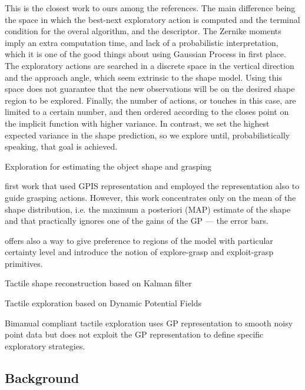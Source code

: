 This is the closest work to ours among the references. The main difference being the space in which the best-next exploratory action is computed and the terminal condition for the overal algorithm, and the descriptor. The Zernike moments imply an extra computation time, and lack of a probabilistic interpretation, which it is one of the good things about using Gaussian Process in first place. The exploratory actions are searched in a discrete space in the vertical direction and the approach angle, which seem extrinsic to the shape model. Using this space does not guarantee that the new observations will be on the desired shape region to be explored.  Finally, the number of actions, or touches in this case, are limited to a certain number, and then ordered according to the closes point on the implicit function with higher variance. In contrast, we set the highest expected variance in the shape prediction, so we explore until, probabilistically speaking, that goal is achieved.

{\color{red} Exploration for estimating the object shape and grasping}

\cite{Dragiev2011Gaussian} first work that used GPIS representation and employed the representation also to guide grasping actions. However, this work concentrates only on the mean of the shape distribution, i.e. the maximum a posteriori (MAP) estimate of the shape and that practically ignores one of the gains of the GP --- the error bars.

\cite{Dragiev2013Uncertainty} offers also a way to give preference to regions of the model with particular certainty level and introduce the notion of explore-grasp and exploit-grasp primitives.

{\color{red} Tactile shape reconstruction based on Kalman filter}
\citet{Meier2011Probabilistic}

{\color{red} Tactile exploration based on Dynamic Potential Fields}
\citet{Bierbaum2008Potential}

{\color{red} Bimanual compliant tactile exploration}
\citet{Sommer2014Bimanual} uses GP representation to smooth noisy point data but does not exploit the GP representation to define specific exploratory strategies.

\subsection{Background}
\label{sec:background}


